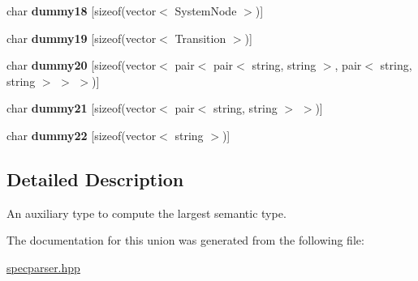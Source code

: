 \begin{DoxyCompactItemize}
\item 
char {\bfseries dummy18} \mbox{[}sizeof(vector$<$ System\+Node $>$)\mbox{]}\hypertarget{unionyy_1_1spec__parser_1_1union__type_add9bb2fd6eb0e53d27390120ef63a5a7}{}\label{unionyy_1_1spec__parser_1_1union__type_add9bb2fd6eb0e53d27390120ef63a5a7}

\item 
char {\bfseries dummy19} \mbox{[}sizeof(vector$<$ Transition $>$)\mbox{]}\hypertarget{unionyy_1_1spec__parser_1_1union__type_a127fdee69967539945d44c7ba8c4bf1f}{}\label{unionyy_1_1spec__parser_1_1union__type_a127fdee69967539945d44c7ba8c4bf1f}

\item 
char {\bfseries dummy20} \mbox{[}sizeof(vector$<$ pair$<$ pair$<$ string, string $>$, pair$<$ string, string $>$ $>$ $>$)\mbox{]}\hypertarget{unionyy_1_1spec__parser_1_1union__type_a8a1b8c90fc7d035fecdf936ddf89e54e}{}\label{unionyy_1_1spec__parser_1_1union__type_a8a1b8c90fc7d035fecdf936ddf89e54e}

\item 
char {\bfseries dummy21} \mbox{[}sizeof(vector$<$ pair$<$ string, string $>$ $>$)\mbox{]}\hypertarget{unionyy_1_1spec__parser_1_1union__type_a7266d28abee569ab846af1eab37714ee}{}\label{unionyy_1_1spec__parser_1_1union__type_a7266d28abee569ab846af1eab37714ee}

\item 
char {\bfseries dummy22} \mbox{[}sizeof(vector$<$ string $>$)\mbox{]}\hypertarget{unionyy_1_1spec__parser_1_1union__type_a0e440a6c825ab5763df783455cc3106e}{}\label{unionyy_1_1spec__parser_1_1union__type_a0e440a6c825ab5763df783455cc3106e}

\end{DoxyCompactItemize}


\subsection{Detailed Description}
An auxiliary type to compute the largest semantic type. 

The documentation for this union was generated from the following file\+:\begin{DoxyCompactItemize}
\item 
\hyperlink{specparser_8hpp}{specparser.\+hpp}\end{DoxyCompactItemize}
